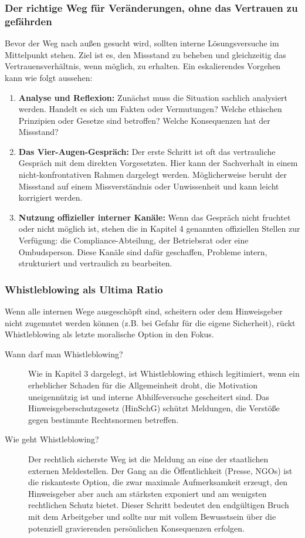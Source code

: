 \documentclass[
    12pt,               %
    a4paper,            %
    ngerman             %
]{scrartcl}
\begin{document}
\subsubsection*{Der richtige Weg für Veränderungen, ohne das Vertrauen zu gefährden}
Bevor der Weg nach außen gesucht wird, sollten interne Lösungsversuche im Mittelpunkt stehen. Ziel ist es, den Missstand zu beheben und gleichzeitig das Vertrauensverhältnis, wenn möglich, zu erhalten. Ein eskalierendes Vorgehen kann wie folgt aussehen:

\begin{enumerate}
    \item \textbf{Analyse und Reflexion:} Zunächst muss die Situation sachlich analysiert werden. Handelt es sich um Fakten oder Vermutungen? Welche ethischen Prinzipien oder Gesetze sind betroffen? Welche Konsequenzen hat der Missstand?
    \item \textbf{Das Vier-Augen-Gespräch:} Der erste Schritt ist oft das vertrauliche Gespräch mit dem direkten Vorgesetzten. Hier kann der Sachverhalt in einem nicht-konfrontativen Rahmen dargelegt werden. Möglicherweise beruht der Missstand auf einem Missverständnis oder Unwissenheit und kann leicht korrigiert werden.
    \item \textbf{Nutzung offizieller interner Kanäle:} Wenn das Gespräch nicht fruchtet oder nicht möglich ist, stehen die in Kapitel 4 genannten offiziellen Stellen zur Verfügung: die Compliance-Abteilung, der Betriebsrat oder eine Ombudsperson. Diese Kanäle sind dafür geschaffen, Probleme intern, strukturiert und vertraulich zu bearbeiten.
\end{enumerate}

\subsubsection*{Whistleblowing als Ultima Ratio}
Wenn alle internen Wege ausgeschöpft sind, scheitern oder dem Hinweisgeber nicht zugemutet werden können (z.B. bei Gefahr für die eigene Sicherheit), rückt Whistleblowing als letzte moralische Option in den Fokus.
\begin{description}
    \item[Wann darf man Whistleblowing?] Wie in Kapitel 3 dargelegt, ist Whistleblowing ethisch legitimiert, wenn ein erheblicher Schaden für die Allgemeinheit droht, die Motivation uneigennützig ist und interne Abhilfeversuche gescheitert sind. Das Hinweisgeberschutzgesetz (HinSchG) schützt Meldungen, die Verstöße gegen bestimmte Rechtsnormen betreffen.
    \item[Wie geht Whistleblowing?] Der rechtlich sicherste Weg ist die Meldung an eine der staatlichen externen Meldestellen. Der Gang an die Öffentlichkeit (Presse, NGOs) ist die riskanteste Option, die zwar maximale Aufmerksamkeit erzeugt, den Hinweisgeber aber auch am stärksten exponiert und am wenigsten rechtlichen Schutz bietet. Dieser Schritt bedeutet den endgültigen Bruch mit dem Arbeitgeber und sollte nur mit vollem Bewusstsein über die potenziell gravierenden persönlichen Konsequenzen erfolgen.
\end{description}
\end{document}
